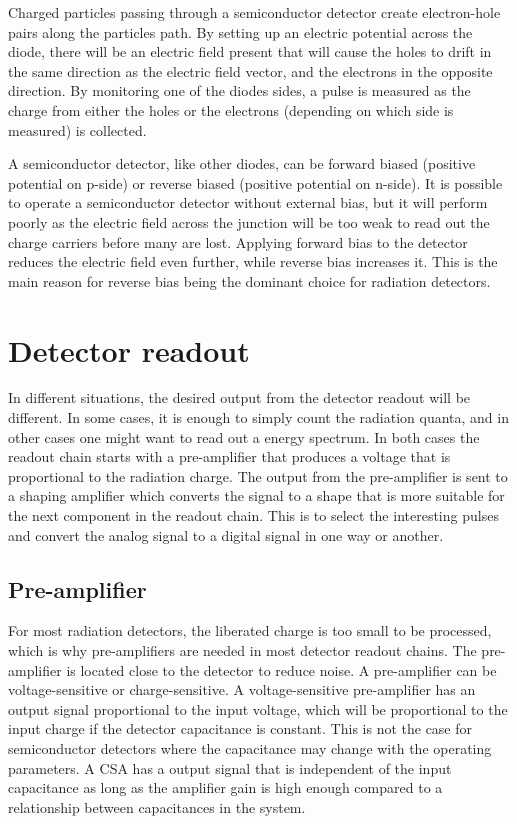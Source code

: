 \documentclass[../main/thesis.tex]{subfiles}
\begin{document}
Charged particles passing through a semiconductor detector create electron-hole pairs along the particles path. By setting up an electric potential across the diode, there will be an electric field present that will cause the holes to drift in the same direction as the electric field vector, and the electrons in the opposite direction. By monitoring one of the diodes sides, a pulse is measured as the charge from either the holes or the electrons (depending on which side is measured) is collected. 

A semiconductor detector, like other diodes, can be forward biased (positive potential on p-side) or reverse biased (positive potential on n-side). It is possible to operate a semiconductor detector without external bias, but it will perform poorly as the electric field across the junction will be too weak to read out the charge carriers before many are lost. Applying forward bias to the detector reduces the electric field even further, while reverse bias increases it. This is the main reason for reverse bias being the dominant choice for radiation detectors. \citep[chap. 11]{Knoll}





\section{Detector readout}
\label{t-read}
In different situations, the desired output from the detector readout will be different. In some cases, it is enough to simply count the radiation quanta, and in other cases one might want to read out a energy spectrum. In both cases the readout chain starts with a pre-amplifier that produces a voltage that is proportional to the radiation charge. The output from the pre-amplifier is sent to a shaping amplifier which converts the signal to a shape that is more suitable for the next component in the readout chain. This is to select the interesting pulses and convert the analog signal to a digital signal in one way or another. \citep[chap. 16]{Knoll}

\subsection{Pre-amplifier}
\label{t-amp}
For most radiation detectors, the liberated charge is too small to be processed, which is why pre-amplifiers are needed in most detector readout chains. The pre-amplifier is located close to the detector to reduce noise. A pre-amplifier can be voltage-sensitive or charge-sensitive. A voltage-sensitive pre-amplifier has an output signal proportional to the input voltage, which will be proportional to the input charge if the detector capacitance is constant. This is not the case for semiconductor detectors where the capacitance may change with the operating parameters. A \gls{CSA} has a output signal that is independent of the input capacitance as long as the amplifier gain is high enough compared to a relationship between capacitances in the system. \citep[chap. 16]{Knoll}
\end{document}
